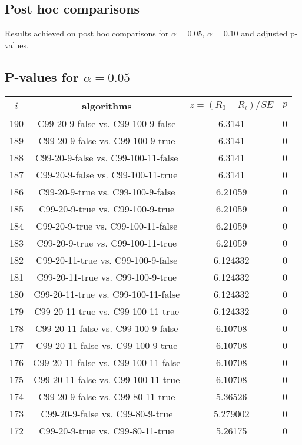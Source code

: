 \documentclass[a4paper,10pt]{article}
\begin{document}
\begin{landscape}
\pagebreak

\section{Post hoc comparisons}

Results achieved on post hoc comparisons for $\alpha = 0.05$, $\alpha = 0.10$ and adjusted p-values.

\subsection{P-values for $\alpha=0.05$}

\begin{table}[!htp]
\centering\scriptsize
\begin{tabular}{cccc}
$i$&algorithms&$z=(R_0 - R_i)/SE$&$p$\\
\hline190&C99-20-9-false vs. C99-100-9-false&6.3141&0\\
189&C99-20-9-false vs. C99-100-9-true&6.3141&0\\
188&C99-20-9-false vs. C99-100-11-false&6.3141&0\\
187&C99-20-9-false vs. C99-100-11-true&6.3141&0\\
186&C99-20-9-true vs. C99-100-9-false&6.21059&0\\
185&C99-20-9-true vs. C99-100-9-true&6.21059&0\\
184&C99-20-9-true vs. C99-100-11-false&6.21059&0\\
183&C99-20-9-true vs. C99-100-11-true&6.21059&0\\
182&C99-20-11-true vs. C99-100-9-false&6.124332&0\\
181&C99-20-11-true vs. C99-100-9-true&6.124332&0\\
180&C99-20-11-true vs. C99-100-11-false&6.124332&0\\
179&C99-20-11-true vs. C99-100-11-true&6.124332&0\\
178&C99-20-11-false vs. C99-100-9-false&6.10708&0\\
177&C99-20-11-false vs. C99-100-9-true&6.10708&0\\
176&C99-20-11-false vs. C99-100-11-false&6.10708&0\\
175&C99-20-11-false vs. C99-100-11-true&6.10708&0\\
174&C99-20-9-false vs. C99-80-11-true&5.36526&0\\
173&C99-20-9-false vs. C99-80-9-true&5.279002&0\\
172&C99-20-9-true vs. C99-80-11-true&5.26175&0\\

\end{tabular}
\end{table}
\end{landscape}
\end{document}
